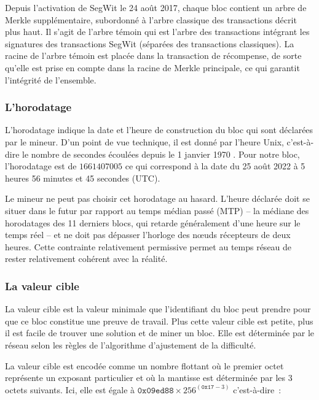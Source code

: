 Depuis l'activation de SegWit le 24 août 2017, chaque bloc contient un arbre de Merkle supplémentaire, subordonné à l'arbre classique des transactions décrit plus haut. Il s'agit de l'arbre témoin qui est l'arbre des transactions intégrant les signatures des transactions SegWit (séparées des transactions classiques). La racine de l'arbre témoin est placée dans la transaction de récompense, de sorte qu'elle est prise en compte dans la racine de Merkle principale, ce qui garantit l'intégrité de l'ensemble.


\subsubsection*{L'horodatage} L'horodatage indique la date et l'heure de construction du bloc qui sont déclarées par le mineur. D'un point de vue technique, il est donné par l'heure Unix, c'est-à-dire le nombre de secondes écoulées depuis le 1\ier{} janvier 1970 . Pour notre bloc, l'horodatage est de $1661407005$ ce qui correspond à la date du 25 août 2022 à 5 heures 56 minutes et 45 secondes (UTC).

Le mineur ne peut pas choisir cet horodatage au hasard. L'heure déclarée doit se situer dans le futur par rapport au temps médian passé (MTP) -- la médiane des horodatages des 11 derniers blocs, qui retarde généralement d'une heure sur le temps réel -- et ne doit pas dépasser l'horloge des nœuds récepteurs de deux heures. Cette contrainte relativement permissive permet au temps réseau de rester relativement cohérent avec la réalité.


\subsubsection*{La valeur cible} La valeur cible est la valeur minimale que l'identifiant du bloc peut prendre pour que ce bloc constitue une preuve de travail. Plus cette valeur cible est petite, plus il est facile de trouver une solution et de miner un bloc. Elle est déterminée par le réseau selon les règles de l'algorithme d'ajustement de la difficulté.

La valeur cible est encodée comme un nombre flottant où le premier octet représente un exposant particulier et où la mantisse est déterminée par les 3 octets suivants. Ici, elle est égale à $\mathtt{0x09ed88} \times 256^{(\mathtt{0x17} - 3)}$ c'est-à-dire~:

